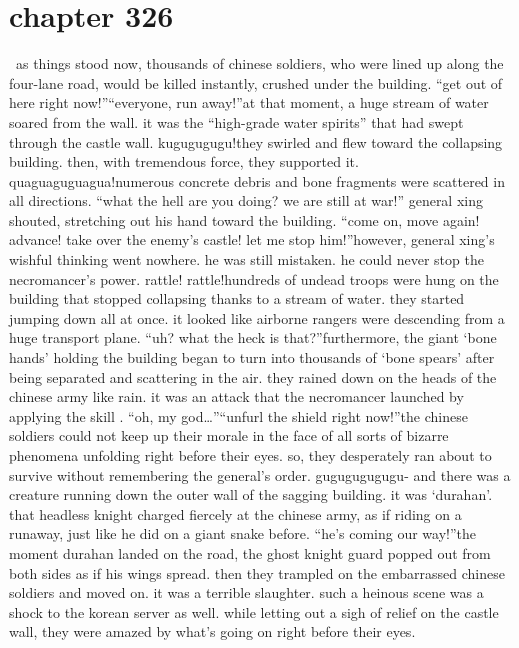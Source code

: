 \section{chapter 326}






 as things stood now, thousands of chinese soldiers, who were lined up along the four-lane road, would be killed instantly, crushed under the building.
“get out of here right now!”“everyone, run away!”at that moment, a huge stream of water soared from the wall.
 it was the “high-grade water spirits” that had swept through the castle wall.
kugugugugu!they swirled and flew toward the collapsing building.
 then, with tremendous force, they supported it.
quaguaguguagua!numerous concrete debris and bone fragments were scattered in all directions.
“what the hell are you doing? we are still at war!” general xing shouted, stretching out his hand toward the building.
 “come on, move again! advance! take over the enemy’s castle! let me stop him!”however, general xing’s wishful thinking went nowhere.
 he was still mistaken.
 he could never stop the necromancer’s power.
rattle! rattle!hundreds of undead troops were hung on the building that stopped collapsing thanks to a stream of water.
 they started jumping down all at once.
 it looked like airborne rangers were descending from a huge transport plane.
“uh? what the heck is that?”furthermore, the giant ‘bone hands’ holding the building began to turn into thousands of ‘bone spears’ after being separated and scattering in the air.
 they rained down on the heads of the chinese army like rain.
 it was an attack that the necromancer launched by applying the skill .
“oh, my god…”“unfurl the shield right now!”the chinese soldiers could not keep up their morale in the face of all sorts of bizarre phenomena unfolding right before their eyes.
 so, they desperately ran about to survive without remembering the general’s order.
gugugugugugu-
and there was a creature running down the outer wall of the sagging building.
it was ‘durahan’.
 that headless knight charged fiercely at the chinese army, as if riding on a runaway, just like he did on a giant snake before.
“he’s coming our way!”the moment durahan landed on the road, the ghost knight guard popped out from both sides as if his wings spread.
 then they trampled on the embarrassed chinese soldiers and moved on.
 it was a terrible slaughter.
such a heinous scene was a shock to the korean server as well.
 while letting out a sigh of relief on the castle wall, they were amazed by what’s going on right before their eyes.
